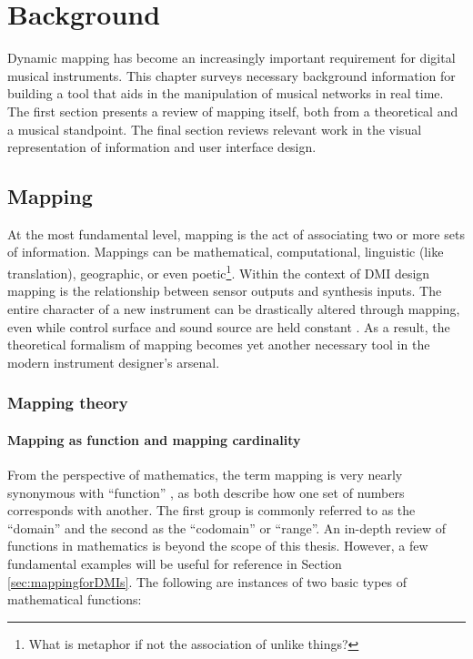 \chapter{Background}

Dynamic mapping has become an increasingly important requirement for digital musical instruments. This chapter surveys necessary background information for building a tool that aids in the manipulation of musical networks in real time. The first section presents a review of mapping itself, both from a theoretical and a musical standpoint. The final section reviews relevant work in the visual representation of information and user interface design. 

\section{Mapping}

At the most fundamental level, mapping is the act of associating two or more sets of information. Mappings can be mathematical, computational, linguistic (like translation), geographic, or even poetic\footnote{What is metaphor if not the association of unlike things?}. Within the context of DMI design mapping is the relationship between sensor outputs and synthesis inputs. The entire character of a new instrument can be drastically altered through mapping, even while control surface and sound source are held constant . As a result, the theoretical formalism of mapping becomes yet another necessary tool in the modern instrument designer's arsenal.

\subsection{Mapping theory}
	\label{sec:mapping_theory}

	\subsubsection{Mapping as function and mapping cardinality}

From the perspective of mathematics, the term mapping is very nearly synonymous with ``function'' \cite{native_set_theory}, as both describe how one set of numbers corresponds with another. The first group is commonly referred to as the ``domain'' and the second as the ``codomain'' or ``range''. An in-depth review of functions in mathematics is beyond the scope of this thesis. However, a few fundamental examples will be useful for reference in Section \ref{sec:mappingforDMIs}. The following are instances of two basic types of mathematical functions:


